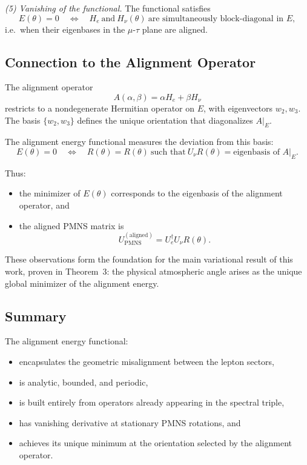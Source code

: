 \emph{(5) Vanishing of the functional.}
The functional satisfies
\[
E(\theta)=0
\quad\Longleftrightarrow\quad
H_e \ \text{and}\ H_\nu(\theta)\ \text{are simultaneously block-diagonal in } E,
\]
i.e.\ when their eigenbases in the $\mu$-$\tau$ plane are aligned.

\subsection{Connection to the Alignment Operator}

The alignment operator
\[
A(\alpha,\beta)=\alpha H_e + \beta H_\nu
\]
restricts to a nondegenerate Hermitian operator on $E$, with eigenvectors $w_2,w_3$. The basis $\{w_2,w_3\}$ defines the unique orientation that diagonalizes $A|_E$.

The alignment energy functional measures the deviation from this basis:
\[
E(\theta)=0
\quad\Longleftrightarrow\quad
R(\theta)=R(\theta)
\ \text{such that}\
U_\nu R(\theta)=\text{eigenbasis of } A|_E.
\]

Thus:
\begin{itemize}
\item the minimizer of $E(\theta)$ corresponds to the eigenbasis of the alignment operator, and
\item the aligned PMNS matrix is
\[
U_{\mathrm{PMNS}}^{(\mathrm{aligned})}
= U_e^\dagger U_\nu R(\theta).
\]
\end{itemize}

These observations form the foundation for the main variational result of this work, proven in Theorem~3: the physical atmospheric angle arises as the unique global minimizer of the alignment energy.

\subsection{Summary}

The alignment energy functional:
\begin{itemize}
\item encapsulates the geometric misalignment between the lepton sectors,
\item is analytic, bounded, and periodic,
\item is built entirely from operators already appearing in the spectral triple,
\item has vanishing derivative at stationary PMNS rotations, and
\item achieves its unique minimum at the orientation selected by the alignment operator.
\end{itemize}

